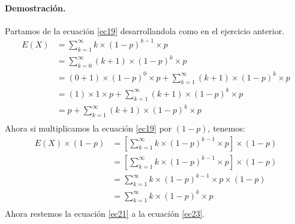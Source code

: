 \documentclass[12pt]{article}
\begin{document}
\paragraph{Demostración.}
Partamos de la ecuación \ref{ec19} desarrollandola como en el ejercicio anterior.\\
\begin{equation}\label{ec23}
\begin{split}
E(X) &= \sum_{k=1}^{\infty}{k \times (1 - p)^{k-1} \times p}\\
&= \sum_{k=0}^{\infty}{(k+1) \times (1 - p)^{k} \times p}\\
&= (0+1)\times (1 - p)^{0}\times p + \sum_{k=1}^{\infty}{(k+1) \times (1 - p)^{k} \times p}\\
&= (1)\times 1 \times p + \sum_{k=1}^{\infty}{(k+1) \times (1 - p)^{k} \times p}\\
&= p + \sum_{k=1}^{\infty}{(k+1) \times (1 - p)^{k} \times p}\\
\end{split}
\end{equation}
Ahora si multiplicamos la ecuación \ref{ec19} por $(1-p)$, tenemos: \\
\begin{equation}\label{ec21}
\begin{split}
E(X) \times (1-p) &= [\sum_{k=1}^{\infty}{k \times (1 - p)^{k-1} \times p}] \times (1-p)\\
&= [\sum_{k=1}^{\infty}{k \times (1 - p)^{k-1} \times p}] \times (1-p)\\
&= \sum_{k=1}^{\infty}{k \times (1 - p)^{k-1} \times p} \times (1-p)\\
&= \sum_{k=1}^{\infty}{k \times (1 - p)^{k} \times p}\\
\end{split}
\end{equation}
Ahora restemos la ecuación \ref{ec21} a la ecuación \ref{ec23}.
\end{document}

